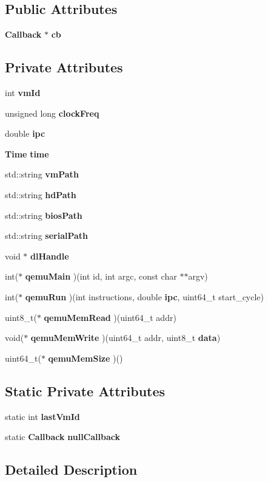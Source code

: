 \subsection*{Public Attributes}
\begin{CompactItemize}
\item 
{\bf Callback} $\ast$ {\bf cb}
\end{CompactItemize}
\subsection*{Private Attributes}
\begin{CompactItemize}
\item 
int {\bf vmId}
\item 
unsigned long {\bf clockFreq}
\item 
double {\bf ipc}
\item 
{\bf Time} {\bf time}
\item 
std::string {\bf vmPath}
\item 
std::string {\bf hdPath}
\item 
std::string {\bf biosPath}
\item 
std::string {\bf serialPath}
\item 
void $\ast$ {\bf dlHandle}
\item 
int($\ast$ {\bf qemuMain} )(int id, int argc, const char $\ast$$\ast$argv)
\item 
int($\ast$ {\bf qemuRun} )(int instructions, double {\bf ipc}, uint64\_\-t start\_\-cycle)
\item 
uint8\_\-t($\ast$ {\bf qemuMemRead} )(uint64\_\-t addr)
\item 
void($\ast$ {\bf qemuMemWrite} )(uint64\_\-t addr, uint8\_\-t {\bf data})
\item 
uint64\_\-t($\ast$ {\bf qemuMemSize} )()
\end{CompactItemize}
\subsection*{Static Private Attributes}
\begin{CompactItemize}
\item 
static int {\bf lastVmId}
\item 
static {\bf Callback} {\bf nullCallback}
\end{CompactItemize}


\subsection{Detailed Description}



